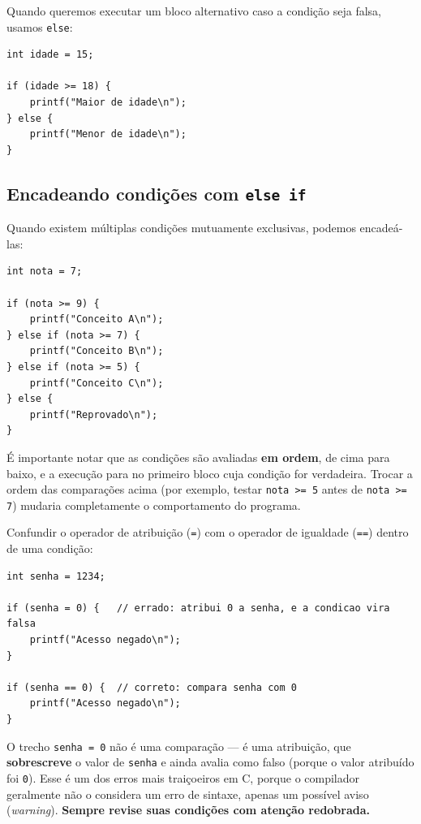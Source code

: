 Quando queremos executar um bloco alternativo caso a condição seja falsa, usamos \texttt{else}:

\begin{lstlisting}
int idade = 15;

if (idade >= 18) {
    printf("Maior de idade\n");
} else {
    printf("Menor de idade\n");
}
\end{lstlisting}

\subsection{Encadeando condições com \texttt{else if}}

Quando existem múltiplas condições mutuamente exclusivas, podemos encadeá-las:

\begin{lstlisting}
int nota = 7;

if (nota >= 9) {
    printf("Conceito A\n");
} else if (nota >= 7) {
    printf("Conceito B\n");
} else if (nota >= 5) {
    printf("Conceito C\n");
} else {
    printf("Reprovado\n");
}
\end{lstlisting}

É importante notar que as condições são avaliadas \textbf{em ordem}, de cima para baixo, e a execução para no primeiro bloco cuja condição for verdadeira. Trocar a ordem das comparações acima (por exemplo, testar \texttt{nota >= 5} antes de \texttt{nota >= 7}) mudaria completamente o comportamento do programa.

\begin{errocomum}
Confundir o operador de atribuição (\texttt{=}) com o operador de igualdade (\texttt{==}) dentro de uma condição:
\begin{lstlisting}
int senha = 1234;

if (senha = 0) {   // errado: atribui 0 a senha, e a condicao vira falsa
    printf("Acesso negado\n");
}

if (senha == 0) {  // correto: compara senha com 0
    printf("Acesso negado\n");
}
\end{lstlisting}
O trecho \texttt{senha = 0} não é uma comparação — é uma atribuição, que \textbf{sobrescreve} o valor de \texttt{senha} e ainda avalia como falso (porque o valor atribuído foi \texttt{0}). Esse é um dos erros mais traiçoeiros em C, porque o compilador geralmente não o considera um erro de sintaxe, apenas um possível aviso (\textit{warning}). \textbf{Sempre revise suas condições com atenção redobrada.}
\end{errocomum}

